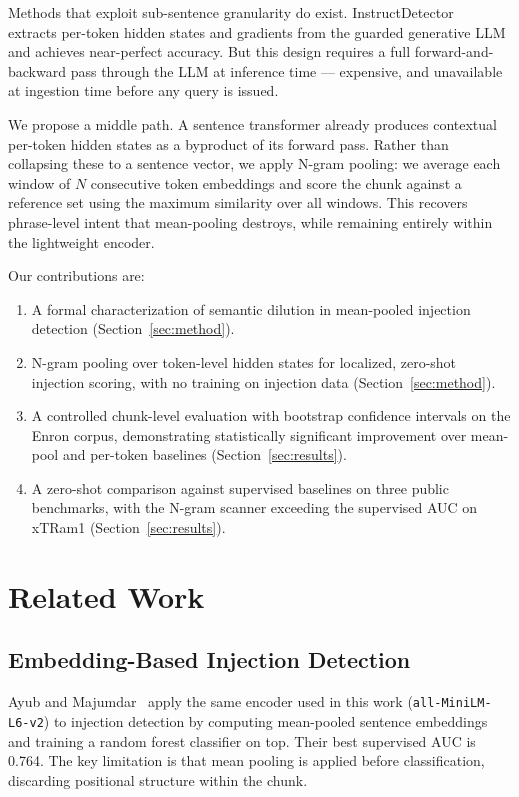 \documentclass[conference]{IEEEtran}
\begin{document}
Methods that exploit sub-sentence granularity do exist. InstructDetector~\cite{wen2025instructdetector}
extracts per-token hidden states and gradients from the guarded generative LLM and
achieves near-perfect accuracy. But this design requires a full forward-and-backward
pass through the LLM at inference time --- expensive, and unavailable at ingestion time
before any query is issued.

We propose a middle path. A sentence transformer already produces contextual per-token
hidden states as a byproduct of its forward pass. Rather than collapsing these to a
sentence vector, we apply N-gram pooling: we average each window of \(N\) consecutive
token embeddings and score the chunk against a reference set using the maximum
similarity over all windows. This recovers phrase-level intent that mean-pooling
destroys, while remaining entirely within the lightweight encoder.

Our contributions are:
\begin{enumerate}
  \item A formal characterization of semantic dilution in mean-pooled injection
        detection (Section~\ref{sec:method}).
  \item N-gram pooling over token-level hidden states for localized, zero-shot injection
        scoring, with no training on injection data (Section~\ref{sec:method}).
  \item A controlled chunk-level evaluation with bootstrap confidence intervals on the
        Enron corpus, demonstrating statistically significant improvement over mean-pool
        and per-token baselines (Section~\ref{sec:results}).
  \item A zero-shot comparison against supervised baselines on three public benchmarks,
        with the N-gram scanner exceeding the supervised AUC on xTRam1
        (Section~\ref{sec:results}).
\end{enumerate}

\section{Related Work}
\label{sec:related}

\subsection{Embedding-Based Injection Detection}

Ayub and Majumdar~\cite{ayub2024embedding} apply the same encoder used in this work
(\texttt{all-MiniLM-L6-v2}) to injection detection by computing mean-pooled sentence
embeddings and training a random forest classifier on top. Their best supervised AUC
is 0.764. The key limitation is that mean pooling is applied before classification,
discarding positional structure within the chunk.
\end{document}
